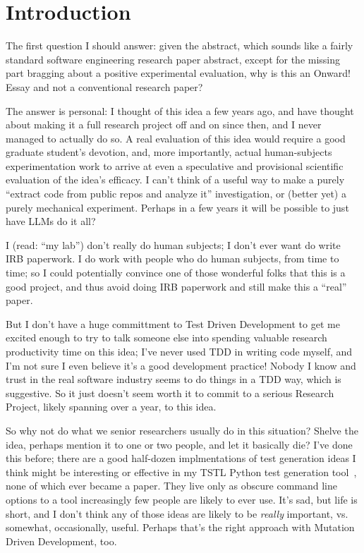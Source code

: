 \documentclass[sigplan,screen]{acmart}
\begin{document}
\maketitle


\section{Introduction}

The first question I should answer: given the abstract, which sounds
like a fairly standard software engineering research paper abstract,
except for the missing part bragging
about a positive experimental evaluation, why is this an Onward! Essay
and not a conventional research paper?

The answer is personal:  I thought of this idea a few years ago, and
have thought about making it a full research project off and on since
then, and I
never managed to actually do so.  A real evaluation of this idea would
require a good graduate student's devotion, and, more importantly,
actual human-subjects experimentation work to arrive at even a
speculative and provisional scientific evaluation of the idea's
efficacy.  I can't think of a useful way to make a purely ``extract
code from public repos and analyze it'' investigation, or (better yet)
a purely mechanical experiment.  Perhaps in a few years it will be
possible to just have LLMs do it all?

I (read: ``my lab'') don't really do human subjects; I don't ever want do
write IRB paperwork.  I do work with people who do human subjects,
from time to time; so I could potentially convince one of those
wonderful folks that this is a good project, and thus avoid doing IRB
paperwork and still make this a ``real'' paper.

But I don't have a huge committment to Test
Driven Development to get me excited enough to try to talk someone
else into spending valuable research productivity time on this idea; I've never used
TDD in writing code myself, and I'm not sure I even believe it's a good development
practice!  Nobody I know and trust in the real software industry seems
to do things in a TDD way, which is suggestive.  So it just doesn't
seem worth it to commit to a serious Research Project, likely spanning
over a year, to this idea.

So why not do what we senior researchers usually do in this situation?
Shelve the idea, perhaps mention it to one or two people, and let it
basically die?  I've done this before; there are a good half-dozen
implmentations of test generation ideas I think might be interesting
or effective in my TSTL Python test generation tool~\cite{tstlsttt}, none of which
ever became a paper.  They live only as obscure command line options
to a tool increasingly few people are likely to ever use.  It's sad,
but life is short, and I don't think any of those ideas are likely to
be \emph{really} important, vs. somewhat, occasionally, useful.
Perhaps that's the right approach with Mutation Driven Development, too.
\end{document}

